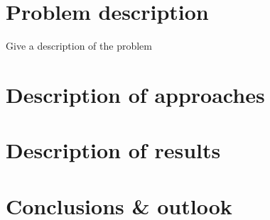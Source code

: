 \documentclass[12pt]{article}
\begin{document}
\tableofcontents
\newpage




\section{Problem description}
Give a description of the problem







\section{Description of approaches}







\section{Description of results}







\section{Conclusions \& outlook}










\end{document}
